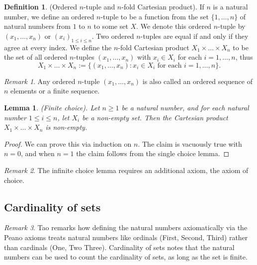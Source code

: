 \documentclass[12pt]{article}
\newtheorem{lemma}[theorem]{Lemma}
\theoremstyle{definition}
\newtheorem{definition}[theorem]{Definition}
\theoremstyle{remark}
\newtheorem*{remark}{Remark}
\begin{document}
\begin{definition}
    (Ordered $n$-tuple and $n$-fold Cartesian product). If $n$ is a natural number, we define an ordered $n$-tuple to be a function from the set $\{1, \dots, n\}$ of natural numbers from $1$ to $n$ to some set $X$. We denote this ordered $n$-tuple by $(x_1, \dots, x_n)$ or $(x_i)_{1 \leq i \leq n}$. Two ordered $n$-tuples are equal if and only if they agree at every index. We define the $n$-fold Cartesian product $X_1 \times \dots \times X_n$ to be the set of all ordered $n$-tuples $(x_1, \dots, x_n)$ with $x_i \in X_i$ for each $i = 1, \dots, n$, thus \[
        X_1 \times \dots \times X_n := \{(x_1, \dots, x_n) \colon x_i \in X_i \text{ for each } i = 1, \dots, n\}
    .\]
\end{definition}

\begin{remark}
    Any ordered $n$-tuple $(x_1, \dots, x_n)$ is also called an ordered sequence of $n$ elements or a finite sequence. 
\end{remark}

\begin{lemma}
    (Finite choice). Let $n \geq 1$ be a natural number, and for each natural number $1 \leq i \leq n$, let $X_i$ be a non-empty set. Then the Cartesian product $X_1 \times \dots \times X_n$ is non-empty.
\end{lemma}

\begin{proof}
    We can prove this via induction on $n$. The claim is vacuously true with $n = 0$, and when $n = 1$ the claim follows from the single choice lemma.
\end{proof}

\begin{remark}
    The infinite choice lemma requires an additional axiom, the axiom of choice.
\end{remark}

\subsection{Cardinality of sets}

\begin{remark}
    Tao remarks how defining the natural numbers axiomatically via the Peano axioms treats natural numbers like ordinals (First, Second, Third) rather than cardinals (One, Two Three). Cardinality of sets notes that the natural numbers can be used to count the cardinality of sets, as long as the set is finite.
\end{remark}
\end{document}
